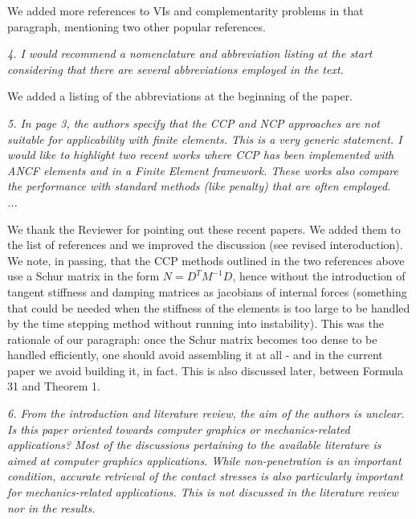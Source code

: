\documentclass[final,12pt]{article}
\def\reviewercomment#1{{\vskip4mm \color{mycommentcolor} \textit{#1} \vskip2mm}}
\begin{document}
We added more references to VIs and complementarity problems in that paragraph, mentioning two other popular references. 


\reviewercomment{
4. I would recommend a nomenclature and abbreviation listing at the start considering that there
are several abbreviations employed in the text.
}

We added a listing of the abbreviations at the beginning of the paper. 


\reviewercomment{
5. In page 3, the authors specify that the CCP and NCP approaches are not suitable for
applicability with finite elements. This is a very generic statement. I would like to highlight two
recent works where CCP has been implemented with ANCF elements and in a Finite Element
framework. These works also compare the performance with standard methods (like penalty)
that are often employed. \\
...
}

We thank the Reviewer for pointing out these recent papers. We added them to the list of references and we improved the discussion (see revised interoduction). 
We note, in passing, that the CCP methods outlined in the two references above use a Schur matrix in the form $N=D^TM^{-1}D$, hence without the introduction of tangent stiffness and damping matrices as jacobians of internal forces (something that could be needed when the stiffness of the elements is too large to be handled by the time stepping method without running into instability). This was the rationale of our paragraph: once the Schur matrix becomes too dense to be handled efficiently, one should avoid assembling it at all - and in the current paper we avoid building it, in fact. This is also discussed later, between Formula 31 and Theorem 1.   


\reviewercomment{
6. From the introduction and literature review, the aim of the authors is unclear. Is this paper
oriented towards computer graphics or mechanics-related applications? Most of the
discussions pertaining to the available literature is aimed at computer graphics applications.
While non-penetration is an important condition, accurate retrieval of the contact stresses is
also particularly important for mechanics-related applications. This is not discussed in the
literature review nor in the results.
}
\end{document}

